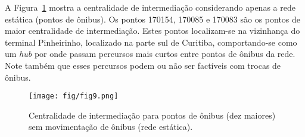 A Figura~\ref{fig:betweeness} mostra a centralidade de intermediação considerando apenas a rede estática (pontos de ônibus). Os pontos 170154, 170085 e 170083 são os pontos de maior centralidade de intermediação. Estes pontos localizam-se na vizinhança do terminal Pinheirinho, localizado na parte sul de Curitiba, comportando-se como um \emph{hub} por onde passam percursos mais curtos entre pontos de ônibus da rede. Note também que esses percursos podem ou não ser factíveis com trocas de ônibus.


\begin{figure}
\centering
\texttt{[image: fig/fig9.png]}
\caption{Centralidade de intermediação para pontos de ônibus (dez maiores) sem movimentação de ônibus (rede estática).}
\label{fig:betweeness}
\end{figure}





